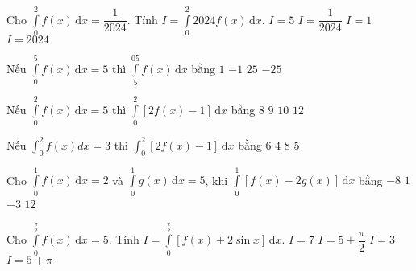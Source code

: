 \begin{ex}%
	Cho $\displaystyle\int\limits_0^2f(x)\mathrm{\,d}x=\dfrac{1}{2024}$. Tính $I=\displaystyle\int\limits_0^2 2024f(x)\mathrm{\,d}x$.
	\choice
	{$I=5$}
	{$I=\dfrac{1}{2024}$}
	{\True $I=1$}
	{$I=2024$}
\end{ex}
\begin{ex}%
	Nếu $\displaystyle\int\limits_0^5f(x)\mathrm{\,d}x=5$ thì $\displaystyle\int\limits_5^05f(x)\mathrm{\,d}x$ bằng
	\choice
	{$1$}
	{$-1$}
	{$25$}
	{\True $-25$}
\end{ex}
\begin{ex}%
	Nếu $\displaystyle\int\limits_0^2f(x)\mathrm{\,d}x=5$ thì $\displaystyle\int\limits_0^2\left[2f(x)-1\right]\mathrm{\,d}x$ bằng
	\choice
	{\True $8$}
	{$9$}
	{$10$}
	{$12$}
\end{ex}
\begin{ex}%
	Nếu $\displaystyle\int_0^2 f(x) d x=3$ thì $\displaystyle\int_0^2\left[2f(x)-1\right]\mathrm{\,d}x$ bằng
	\choice
	{$6$}
	{\True $4$}
	{$8$}
	{$5$}
\end{ex}
\begin{ex}%
	Cho $\displaystyle\int\limits_0^1f(x)\mathrm{\,d}x=2$ và $\displaystyle\int\limits_0^1g(x)\mathrm{\,d}x=5$, khi $\displaystyle\int\limits_0^1\left[f(x)-2g(x)\right]\mathrm{\,d}x$ bằng
	\choice
	{\True $-8$}
	{$1$}
	{$-3$}
	{$12$}
\end{ex}
\begin{ex}%
	Cho $\displaystyle\int\limits_0^{\frac{\pi}{2}}f(x)\mathrm{\,d}x=5$. Tính $I=\displaystyle\int\limits_0^{\frac{\pi}{2}}\left[f(x)+2\sin x\right]\mathrm{\,d}x$.
	\choice
	{\True $I=7$}
	{$I=5+\dfrac{\pi}{2}$}
	{$I=3$}
	{$I=5+\pi $}
\end{ex}
